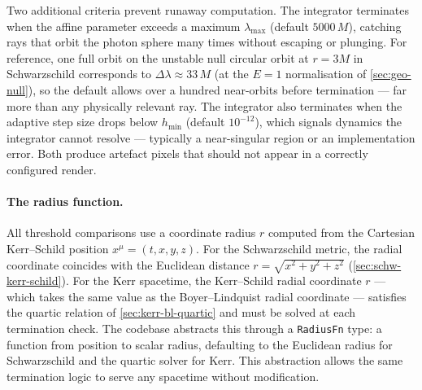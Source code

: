 Two additional criteria prevent runaway computation.  The integrator
terminates when the affine parameter exceeds a maximum
$\lambda_{\text{max}}$ (default $5000\,M$), catching rays that orbit the
photon sphere many times without escaping or plunging.  For reference,
one full orbit on the unstable null circular orbit at $r = 3M$ in
Schwarzschild corresponds to $\Delta\lambda \approx 33\,M$ (at the
$E = 1$ normalisation of \cref{sec:geo-null}), so the default allows
over a hundred near-orbits before termination --- far more than any
physically relevant ray.  The integrator also terminates when the
adaptive step size drops below $h_{\min}$ (default $10^{-12}$), which
signals dynamics the integrator cannot resolve --- typically a
near-singular region or an implementation error.  Both produce artefact
pixels that should not appear in a correctly configured render.

\paragraph{The radius function.}

All threshold comparisons use a coordinate radius $r$ computed from
the Cartesian Kerr--Schild position
$x^\mu = (t, x, y, z)$.  For the Schwarzschild metric, the radial
coordinate coincides with the Euclidean distance
$r = \sqrt{x^2 + y^2 + z^2}$
(\cref{sec:schw-kerr-schild}).  For the Kerr spacetime, the Kerr--Schild
radial coordinate $r$ --- which takes the same value as the
Boyer--Lindquist radial coordinate --- satisfies the quartic relation of
\cref{sec:kerr-bl-quartic} and must be solved at each termination check.
The codebase abstracts this through a \texttt{RadiusFn} type: a function
from position to scalar radius, defaulting to the Euclidean radius for
Schwarzschild and the quartic solver for Kerr.  This abstraction allows
the same termination logic to serve any spacetime without modification.

